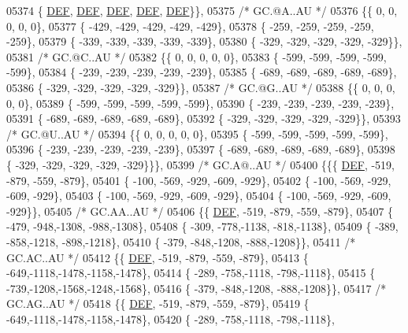 \begin{DoxyCode}
05374 \{  \mbox{\hyperlink{1_88_84__epars_8h_a397419fc12b37ed479c8abb9d444d843}{DEF}},  \mbox{\hyperlink{1_88_84__epars_8h_a397419fc12b37ed479c8abb9d444d843}{DEF}},  \mbox{\hyperlink{1_88_84__epars_8h_a397419fc12b37ed479c8abb9d444d843}{DEF}},  \mbox{\hyperlink{1_88_84__epars_8h_a397419fc12b37ed479c8abb9d444d843}{DEF}},  \mbox{\hyperlink{1_88_84__epars_8h_a397419fc12b37ed479c8abb9d444d843}{DEF}}\}\},
05375 \textcolor{comment}{/* GC.@A..AU */}
05376 \{\{    0,    0,    0,    0,    0\},
05377 \{ -429, -429, -429, -429, -429\},
05378 \{ -259, -259, -259, -259, -259\},
05379 \{ -339, -339, -339, -339, -339\},
05380 \{ -329, -329, -329, -329, -329\}\},
05381 \textcolor{comment}{/* GC.@C..AU */}
05382 \{\{    0,    0,    0,    0,    0\},
05383 \{ -599, -599, -599, -599, -599\},
05384 \{ -239, -239, -239, -239, -239\},
05385 \{ -689, -689, -689, -689, -689\},
05386 \{ -329, -329, -329, -329, -329\}\},
05387 \textcolor{comment}{/* GC.@G..AU */}
05388 \{\{    0,    0,    0,    0,    0\},
05389 \{ -599, -599, -599, -599, -599\},
05390 \{ -239, -239, -239, -239, -239\},
05391 \{ -689, -689, -689, -689, -689\},
05392 \{ -329, -329, -329, -329, -329\}\},
05393 \textcolor{comment}{/* GC.@U..AU */}
05394 \{\{    0,    0,    0,    0,    0\},
05395 \{ -599, -599, -599, -599, -599\},
05396 \{ -239, -239, -239, -239, -239\},
05397 \{ -689, -689, -689, -689, -689\},
05398 \{ -329, -329, -329, -329, -329\}\}\},
05399 \textcolor{comment}{/* GC.A@..AU */}
05400 \{\{\{  \mbox{\hyperlink{1_88_84__epars_8h_a397419fc12b37ed479c8abb9d444d843}{DEF}}, -519, -879, -559, -879\},
05401 \{ -100, -569, -929, -609, -929\},
05402 \{ -100, -569, -929, -609, -929\},
05403 \{ -100, -569, -929, -609, -929\},
05404 \{ -100, -569, -929, -609, -929\}\},
05405 \textcolor{comment}{/* GC.AA..AU */}
05406 \{\{  \mbox{\hyperlink{1_88_84__epars_8h_a397419fc12b37ed479c8abb9d444d843}{DEF}}, -519, -879, -559, -879\},
05407 \{ -479, -948,-1308, -988,-1308\},
05408 \{ -309, -778,-1138, -818,-1138\},
05409 \{ -389, -858,-1218, -898,-1218\},
05410 \{ -379, -848,-1208, -888,-1208\}\},
05411 \textcolor{comment}{/* GC.AC..AU */}
05412 \{\{  \mbox{\hyperlink{1_88_84__epars_8h_a397419fc12b37ed479c8abb9d444d843}{DEF}}, -519, -879, -559, -879\},
05413 \{ -649,-1118,-1478,-1158,-1478\},
05414 \{ -289, -758,-1118, -798,-1118\},
05415 \{ -739,-1208,-1568,-1248,-1568\},
05416 \{ -379, -848,-1208, -888,-1208\}\},
05417 \textcolor{comment}{/* GC.AG..AU */}
05418 \{\{  \mbox{\hyperlink{1_88_84__epars_8h_a397419fc12b37ed479c8abb9d444d843}{DEF}}, -519, -879, -559, -879\},
05419 \{ -649,-1118,-1478,-1158,-1478\},
05420 \{ -289, -758,-1118, -798,-1118\},

\end{DoxyCode}
